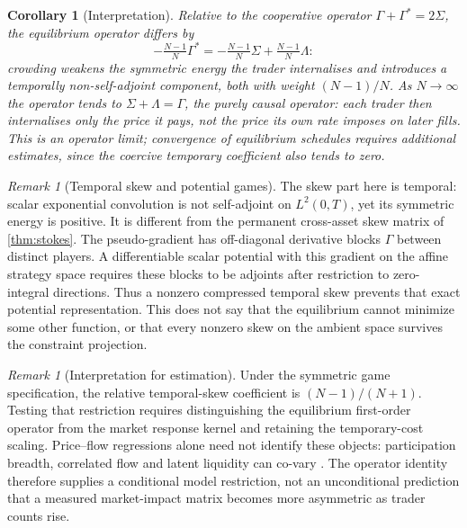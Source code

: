\documentclass[11pt]{article}
\numberwithin{equation}{section}
\newtheorem{corollary}[theorem]{Corollary}
\theoremstyle{definition}
\theoremstyle{remark}
\newtheorem{remark}[theorem]{Remark}
\theoremstyle{definition}
\begin{document}
\begin{corollary}[Interpretation]\label{cor:crowdinterp}
Relative to the cooperative operator $\Gamma+\Gamma^*=2\Sigma$, the equilibrium
operator differs by
\[
 -\tfrac{N-1}N\Gamma^*=-\tfrac{N-1}N\Sigma+\tfrac{N-1}N\Lambda :
\]
crowding weakens the symmetric energy the trader internalises \emph{and}
introduces a temporally non-self-adjoint component, both with weight
$(N-1)/N$. As $N\to\infty$ the operator tends to $\Sigma+\Lambda=\Gamma$, the
purely causal operator: each trader then internalises only the price it pays,
not the price its own rate imposes on later fills. This is an operator limit; convergence of equilibrium schedules requires
additional estimates, since the coercive temporary coefficient also tends to zero.
\end{corollary}

\begin{remark}[Temporal skew and potential games]\label{rem:crowdnotmanip}
The skew part here is temporal: scalar exponential convolution is not
self-adjoint on $L^2(0,T)$, yet its symmetric energy is positive. It is
different from the permanent cross-asset skew matrix of \cref{thm:stokes}.
The pseudo-gradient has off-diagonal derivative blocks $\Gamma$ between
distinct players. A differentiable scalar potential with this gradient on
the affine strategy space requires these blocks to be adjoints after
restriction to zero-integral directions. Thus a nonzero compressed temporal
skew prevents that exact potential representation. This does not say that
the equilibrium cannot minimize some other function, or that every nonzero
skew on the ambient space survives the constraint projection.
\end{remark}

\begin{remark}[Interpretation for estimation]\label{rem:estimation}
Under the symmetric game specification, the relative temporal-skew coefficient
is $(N-1)/(N+1)$. Testing that restriction requires distinguishing the
equilibrium first-order operator from the market response kernel and retaining
the temporary-cost scaling. Price--flow regressions alone need not identify
these objects: participation breadth, correlated flow and latent liquidity can
co-vary \citep{bouchaud2018}. The operator identity therefore supplies a
conditional model restriction, not an unconditional prediction that a measured
market-impact matrix becomes more asymmetric as trader counts rise.
\end{remark}
\end{document}

